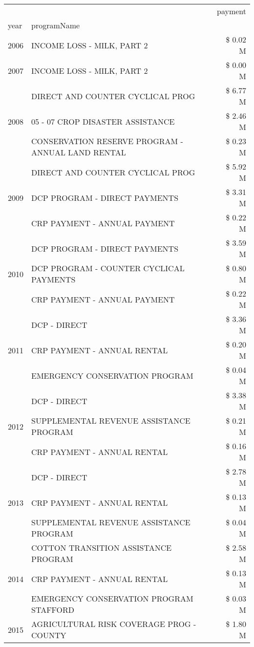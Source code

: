 \begin{tabular}{llr}
\toprule
 &  & payment \\
year & programName &  \\
\midrule
2006 & INCOME LOSS - MILK, PART 2 & \$ 0.02 M \\
\cline{1-3}
2007 & INCOME LOSS - MILK, PART 2 & \$ 0.00 M \\
\cline{1-3}
\multirow[t]{3}{*}{2008} & DIRECT AND COUNTER CYCLICAL PROG & \$ 6.77 M \\
 & 05 - 07 CROP DISASTER ASSISTANCE & \$ 2.46 M \\
 & CONSERVATION RESERVE PROGRAM - ANNUAL LAND RENTAL & \$ 0.23 M \\
\cline{1-3}
\multirow[t]{3}{*}{2009} & DIRECT AND COUNTER CYCLICAL PROG & \$ 5.92 M \\
 & DCP PROGRAM - DIRECT PAYMENTS & \$ 3.31 M \\
 & CRP PAYMENT - ANNUAL PAYMENT & \$ 0.22 M \\
\cline{1-3}
\multirow[t]{3}{*}{2010} & DCP PROGRAM - DIRECT PAYMENTS & \$ 3.59 M \\
 & DCP PROGRAM - COUNTER CYCLICAL PAYMENTS & \$ 0.80 M \\
 & CRP PAYMENT - ANNUAL PAYMENT & \$ 0.22 M \\
\cline{1-3}
\multirow[t]{3}{*}{2011} & DCP - DIRECT & \$ 3.36 M \\
 & CRP PAYMENT - ANNUAL RENTAL & \$ 0.20 M \\
 & EMERGENCY CONSERVATION PROGRAM & \$ 0.04 M \\
\cline{1-3}
\multirow[t]{3}{*}{2012} & DCP - DIRECT & \$ 3.38 M \\
 & SUPPLEMENTAL REVENUE ASSISTANCE PROGRAM & \$ 0.21 M \\
 & CRP PAYMENT - ANNUAL RENTAL & \$ 0.16 M \\
\cline{1-3}
\multirow[t]{3}{*}{2013} & DCP - DIRECT & \$ 2.78 M \\
 & CRP PAYMENT - ANNUAL RENTAL & \$ 0.13 M \\
 & SUPPLEMENTAL REVENUE ASSISTANCE PROGRAM & \$ 0.04 M \\
\cline{1-3}
\multirow[t]{3}{*}{2014} & COTTON TRANSITION ASSISTANCE PROGRAM & \$ 2.58 M \\
 & CRP PAYMENT - ANNUAL RENTAL & \$ 0.13 M \\
 & EMERGENCY CONSERVATION PROGRAM STAFFORD & \$ 0.03 M \\
\cline{1-3}
\multirow[t]{3}{*}{2015} & AGRICULTURAL RISK COVERAGE PROG - COUNTY & \$ 1.80 M \\

\end{tabular}
